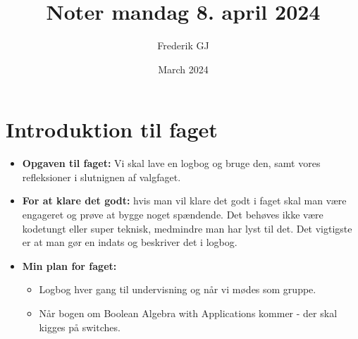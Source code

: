 \documentclass{article}
\title{Noter mandag 8. april 2024}
\author{Frederik GJ}
\date{March 2024}
\begin{document}
\maketitle

\section{Introduktion til faget}

\begin{itemize}
    \item \textbf{Opgaven til faget:} Vi skal lave en logbog og bruge den, samt vores refleksioner i slutnignen af valgfaget. 
    \item \textbf{For at klare det godt:} hvis man vil klare det godt i faget skal man være engageret og prøve at bygge noget spændende. Det behøves ikke være kodetungt eller super teknisk, medmindre man har lyst til det. 
    Det vigtigste er at man gør en indats og beskriver det i logbog. 
    \item \textbf{Min plan for faget:}
    \begin{itemize}
        \item Logbog hver gang til undervisning og når vi mødes som gruppe. 
        \item Når bogen om Boolean Algebra with Applications kommer - der skal kigges på switches. 
    \end{itemize}
\end{itemize}
\end{document}
